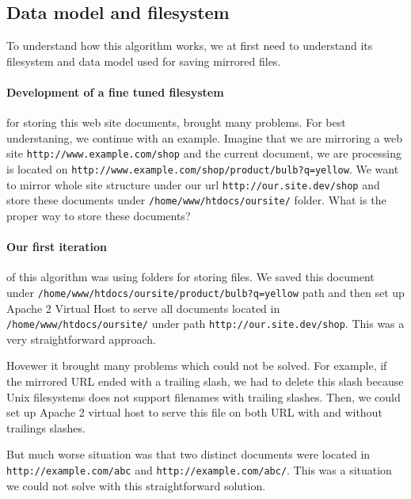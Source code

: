 \subsection{Data model and filesystem}
\label{sec:filesystem}
To understand how this algorithm works, we at first need to understand its filesystem and data model used for saving mirrored files. 

\paragraph{Development of a fine tuned filesystem} for storing this web site documents, brought many problems. For best understaning, we continue with an example. Imagine that we are mirroring a web site \texttt{http://www.example.com/shop} and the current document, we are processing is located on \texttt{http://www.example.com/shop/product/bulb?q=yellow}. We want to mirror whole site structure under our url \texttt{http://our.site.dev/shop} and store these documents under \texttt{/home/www/htdocs/oursite/} folder. What is the proper way to store these documents?

\paragraph{Our first iteration} of this algorithm was using folders for storing files. We saved this document under \texttt{/home/www/htdocs/oursite/product/bulb?q=yellow} path and then set up Apache 2 Virtual Host to serve all documents located in \texttt{/home/www/htdocs/oursite/} under path \texttt{http://our.site.dev/shop}. This was a very straightforward approach.

Hovewer it brought many problems which could not be solved. For example, if the mirrored URL ended with a trailing slash, we had to delete this slash because Unix filesystems does not support filenames with trailing slashes. Then, we could set up Apache 2 virtual host to serve this file on both URL with and without trailings slashes.

But much worse situation was that two distinct documents were located in \texttt{http://example.com/abc} and \texttt{http://example.com/abc/}. This was a situation we could not solve with this straightforward solution.

